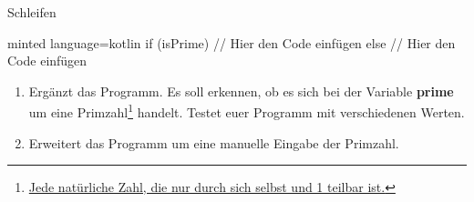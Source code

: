 \begin{task}[points=auto]{Schleifen}
\begin{subtask*}[points=0]{}
\begin{codeBlock}[]{minted language=kotlin}
                if (isPrime) {
                    // Hier den Code einfügen
                } else {
                    // Hier den Code einfügen
                }
        \end{codeBlock}
        \begin{enumerate}
            \item Ergänzt das Programm. Es soll erkennen, ob es sich bei der Variable \textbf{prime} um eine Primzahl\footnote{\href{https://de.wikipedia.org/wiki/Primzahl}{Jede natürliche Zahl, die nur durch sich selbst und 1 teilbar ist.}} handelt. Testet euer Programm mit verschiedenen Werten.
            \item Erweitert das Programm um eine manuelle Eingabe der Primzahl.
        \end{enumerate}

        \begin{solution}
        \end{solution}
    \end{subtask*}
\end{task}

